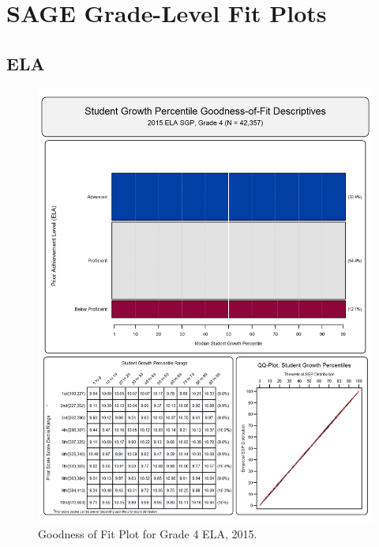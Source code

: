 \documentclass[12pt]{article}
\begin{document}
\section{SAGE Grade-Level Fit Plots}\label{sage-grade-level-fit-plots}

\subsection{ELA}\label{ela}

\begin{figure}[htbp]
\centering
\includegraphics{../img/Goodness_of_Fit/ELA.2015/2015_ELA_4;2014_ELA_3.png}
\caption{Goodness of Fit Plot for Grade 4 ELA, 2015.}
\end{figure}
\end{document}
